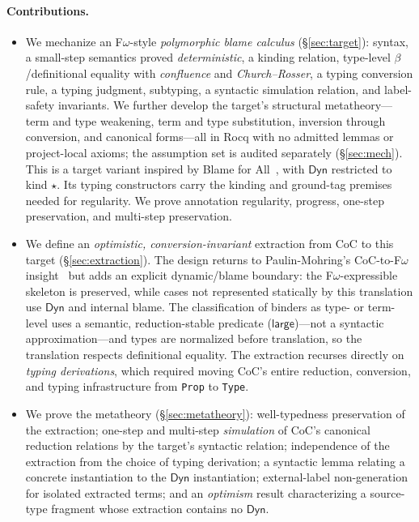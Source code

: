 \documentclass[acmsmall,anonymous=false,nonacm]{acmart}
\newcommand{\dyn}{\ensuremath{\mathsf{Dyn}}}
\newcommand{\kstar}{\ensuremath{\star}}
\newcommand{\islarge}{\mathsf{large}}
\begin{document}
\paragraph{Contributions.}
\begin{itemize}
\item We mechanize an F$\omega$-style \emph{polymorphic blame calculus}
(\S\ref{sec:target}): syntax, a small-step semantics proved \emph{deterministic},
a kinding relation, type-level $\beta$/definitional equality with
\emph{confluence} and \emph{Church--Rosser}, a typing conversion rule, a typing
judgment, subtyping, a syntactic simulation relation, and label-safety
invariants.  We further
develop the target's structural metatheory---term and type weakening, term and
type substitution, inversion through conversion, and canonical forms---all in
Rocq with no admitted lemmas or project-local axioms; the assumption set is
audited separately (\S\ref{sec:mech}).  This is a
target variant inspired by Blame for All~\cite{ahmed2011blame}, with $\dyn$
restricted to kind $\kstar$. Its typing constructors carry the kinding and
ground-tag premises needed for regularity. We prove annotation regularity,
progress, one-step preservation, and multi-step preservation.

\item We define an \emph{optimistic, conversion-invariant} extraction from CoC
to this target (\S\ref{sec:extraction}).  The design returns to
Paulin-Mohring's CoC-to-F$\omega$ insight~\cite{paulinmohring1989fomega} but
adds an explicit dynamic/blame boundary: the F$\omega$-expressible skeleton is
preserved, while cases not represented statically by this translation use
$\dyn$ and internal blame.  The classification of binders as type- or term-level
uses a semantic, reduction-stable predicate ($\islarge$)---not a syntactic
approximation---and types are normalized before translation, so the translation
respects definitional equality. The extraction recurses directly on \emph{typing
derivations}, which required moving CoC's entire reduction, conversion, and
typing infrastructure from \texttt{Prop} to \texttt{Type}.

\item We prove the metatheory (\S\ref{sec:metatheory}): well-typedness
preservation of the extraction; one-step and multi-step \emph{simulation} of
CoC's canonical reduction relations by the target's syntactic relation;
independence of the extraction from the choice of typing derivation; a
syntactic lemma relating a concrete instantiation to the $\dyn$ instantiation;
external-label non-generation for isolated extracted terms; and an
\emph{optimism} result characterizing a source-type fragment whose extraction
contains no $\dyn$.


\end{itemize}
\end{document}
